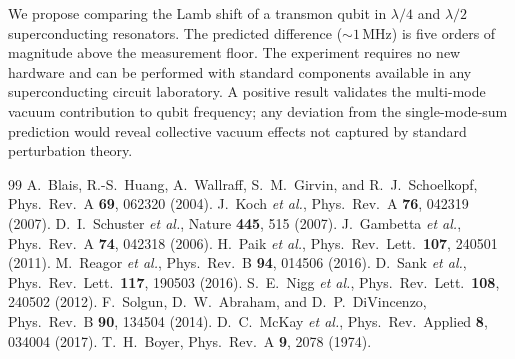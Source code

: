 \documentclass[aps,prl,twocolumn,superscriptaddress,nofootinbib]{revtex4-2}
\begin{document}
We propose comparing the Lamb shift of a transmon qubit in
$\lambda/4$ and $\lambda/2$ superconducting resonators.  The
predicted difference ($\sim 1$\,MHz) is five orders of magnitude
above the measurement floor.  The experiment requires no new
hardware and can be performed with standard components available
in any superconducting circuit laboratory.  A positive result
validates the multi-mode vacuum contribution to qubit frequency;
any deviation from the single-mode-sum prediction would reveal
collective vacuum effects not captured by standard perturbation
theory.

\begin{thebibliography}{99}
 A.~Blais, R.-S.~Huang, A.~Wallraff, S.~M.~Girvin, and R.~J.~Schoelkopf, Phys.\ Rev.\ A \textbf{69}, 062320 (2004).
 J.~Koch \textit{et al.}, Phys.\ Rev.\ A \textbf{76}, 042319 (2007).
 D.~I.~Schuster \textit{et al.}, Nature \textbf{445}, 515 (2007).
 J.~Gambetta \textit{et al.}, Phys.\ Rev.\ A \textbf{74}, 042318 (2006).
 H.~Paik \textit{et al.}, Phys.\ Rev.\ Lett.\ \textbf{107}, 240501 (2011).
 M.~Reagor \textit{et al.}, Phys.\ Rev.\ B \textbf{94}, 014506 (2016).
 D.~Sank \textit{et al.}, Phys.\ Rev.\ Lett.\ \textbf{117}, 190503 (2016).
 S.~E.~Nigg \textit{et al.}, Phys.\ Rev.\ Lett.\ \textbf{108}, 240502 (2012).
 F.~Solgun, D.~W.~Abraham, and D.~P.~DiVincenzo, Phys.\ Rev.\ B \textbf{90}, 134504 (2014).
 D.~C.~McKay \textit{et al.}, Phys.\ Rev.\ Applied \textbf{8}, 034004 (2017).
 T.~H.~Boyer, Phys.\ Rev.\ A \textbf{9}, 2078 (1974).
\end{thebibliography}
\end{document}
